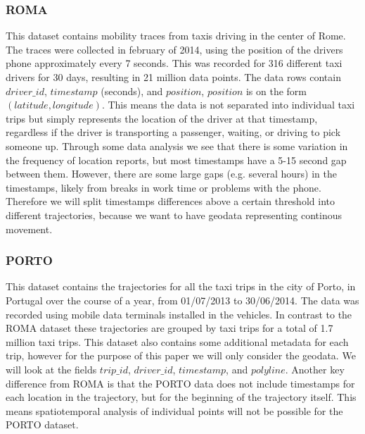 \subsubsection{ROMA}
This dataset contains mobility traces from taxis driving in the center of Rome. The traces were collected in february of 2014, using the position of the drivers phone approximately every 7 seconds. This was recorded for 316 different taxi drivers for 30 days, resulting in 21 million data points. The data rows contain $driver\_id$, $timestamp$ (seconds), and $position$, $position$ is on the form $(latitude, longitude)$. This means the data is not separated into individual taxi trips but simply represents the location of the driver at that timestamp, regardless if the driver is transporting a passenger, waiting, or driving to pick someone up. Through some data analysis we see that there is some variation in the frequency of location reports, but most timestamps have a 5-15 second gap between them. However, there are some large gaps (e.g. several hours) in the timestamps, likely from breaks in work time or problems with the phone. Therefore we will split timestamps differences above a certain threshold into different trajectories, because we want to have geodata representing continous movement.

\subsubsection{PORTO}
This dataset contains the trajectories for all the taxi trips in the city of Porto, in Portugal over the course of a year, from 01/07/2013 to 30/06/2014. The data was recorded using mobile data terminals installed in the vehicles. In contrast to the ROMA dataset these trajectories are grouped by taxi trips for a total of 1.7 million taxi trips. This dataset also contains some additional metadata for each trip, however for the purpose of this paper we will only consider the geodata. We will look at the fields $trip\_id$, $driver\_id$, $timestamp$, and $polyline$. Another key difference from ROMA is that the PORTO data does not include timestamps for each location in the trajectory, but for the beginning of the trajectory itself. This means spatiotemporal analysis of individual points will not be possible for the PORTO dataset.
